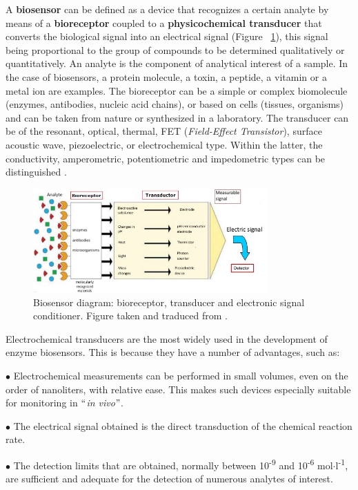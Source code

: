 A \textbf{biosensor} can be defined as a device that recognizes a certain analyte by means of a \textbf{bioreceptor} coupled to a \textbf{physicochemical transducer} that converts the biological signal into an electrical signal (Figure ~\ref{fig:Figura_Biosensor}), this signal being proportional to the group of compounds to be determined qualitatively or quantitatively. An analyte is the component of analytical interest of a sample. In the case of biosensors, a protein molecule, a toxin, a peptide, a vitamin or a metal ion are examples. The bioreceptor can be a simple or complex biomolecule (enzymes, antibodies, nucleic acid chains), or based on cells (tissues, organisms) and can be taken from nature or synthesized in a laboratory. The transducer can be of the resonant, optical, thermal, FET (\textit{Field-Effect Transistor}), surface acoustic wave, piezoelectric, or electrochemical type. Within the latter, the conductivity, amperometric, potentiometric and impedometric types can be distinguished \cite{Eggins}.

\begin{figure}[H]
  \centering
    \includegraphics[width=0.8\textwidth]{Figures/Figura_Biosensor}
  \caption{Biosensor diagram: bioreceptor, transducer and electronic signal conditioner. Figure taken and traduced from \cite{Lili1}.}
  \label{fig:Figura_Biosensor}
\end{figure}

Electrochemical transducers are the most widely used in the development of enzyme biosensors. This is because they have a number of advantages, such as:

$\bullet$ Electrochemical measurements can be performed in small volumes, even on the order of nanoliters, with relative ease. This makes such devices especially suitable for monitoring in $``$\textit{in vivo}$"$.

$\bullet$ The electrical signal obtained is the direct transduction of the chemical reaction rate.

$\bullet$ The detection limits that are obtained, normally between 10\textsuperscript{-9} and 10\textsuperscript{-6} mol$\cdot$l\textsuperscript{-1}, are sufficient and adequate for the detection of numerous analytes of interest.

